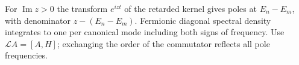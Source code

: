 For $\operatorname{Im}z>0$ the transform $e^{izt}$ of the retarded
kernel gives poles at $E_n-E_m$, with denominator $z-(E_n-E_m)$.
Fermionic diagonal spectral density integrates to one per canonical
mode including both signs of frequency. Use $\mathcal L A=[A,H]$;
exchanging the order of the commutator reflects all pole frequencies.
